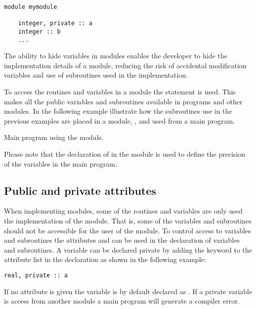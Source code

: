 \begin{lstlisting}
module mymodule

    integer, private :: a
    integer :: b
    ...

\end{lstlisting}

The ability to hide variables in modules enables the developer to hide the implementation details of a module, reducing the risk of accidental modification variables and use of subroutines used in the implementation.

To access the routines and variables in a module the  statement is used. This makes all the public variables and subroutines available in programs and other modules. In the following example illustrate how the subroutines use in the previous examples are placed in a module, , and used from a main program. 



Main program using the  module.



Please note that the declaration of  in the  module is used to define the precision of the variables in the main program.

\subsection{Public and private attributes}

When implementing modules, some of the routines and variables are only used the implementation of the module. That is, some of the variables and subroutines should not be accessible for the user of the module. To control access to variables and subroutines the attributes  and  can be used in the declaration of variables and subroutines. A variable can be declared private by adding the keyword  to the attribute list in the declaration as shown in the following example:

\begin{lstlisting}
real, private :: a
\end{lstlisting}

If no  attribute is given the variable is by default declared as . If a private variable is access from another module a main program will generate a compiler error. 

